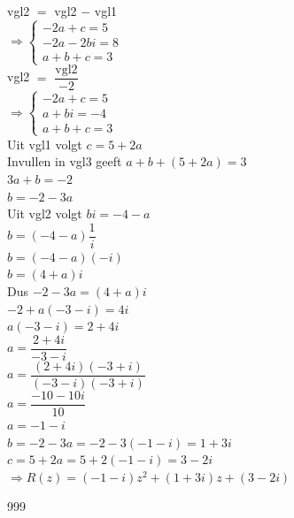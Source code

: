 \documentclass[a4paper]{article}
\begin{document}
vgl2 $=$ vgl2 $-$ vgl1\\

$ \Rightarrow \left \{
\begin{array}{l}
-2a+c=5\\
-2a-2bi=8\\
a+b+c=3
\end{array}
\right .$\\

vgl2 $=$ $\dfrac{\text{vgl2}}{-2}$\\

$ \Rightarrow \left \{
\begin{array}{l}
-2a+c=5\\
a+bi=-4\\
a+b+c=3
\end{array}
\right .$\\

Uit vgl1 volgt $c=5+2a$\\

Invullen in vgl3 geeft $a+b+(5+2a)=3$\\

$3a+b=-2$\\

$b=-2-3a$\\

Uit vgl2 volgt $bi=-4-a$\\

$b=(-4-a)\dfrac{1}{i}$\\

$b=(-4-a)(-i)$\\

$b=(4+a)i$\\

Dus $-2-3a=(4+a)i$\\

$-2+a(-3-i)=4i$\\

$a(-3-i)=2+4i$\\

$a=\dfrac{2+4i}{-3-i}$\\

$a=\dfrac{(2+4i)(-3+i)}{(-3-i)(-3+i)}$\\

$a=\dfrac{-10-10i}{10}$\\

$a=-1-i$\\

$b=-2-3a=-2-3(-1-i)=1+3i$\\

$c=5+2a=5+2(-1-i)=3-2i$\\

$ \Rightarrow R(z) = (-1-i)z^2 + (1+3i)z + (3-2i) $\\

\begin{thebibliography}{999}

\end{thebibliography}
\end{document}
